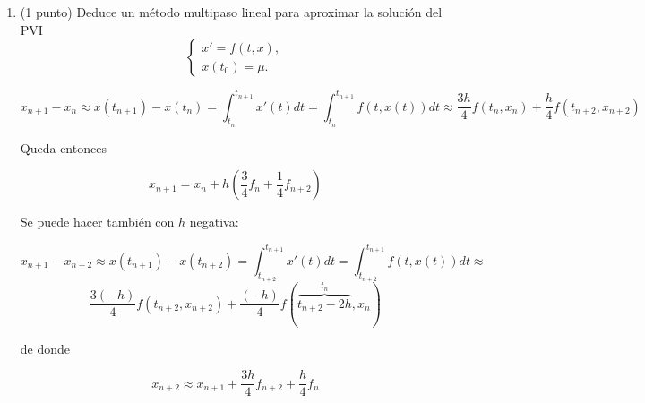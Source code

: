 \documentclass[12pt]{article}
\begin{document}
\begin{ejercicio}[3 puntos]
\begin{enumerate}
        \newpage

        \item (1 punto) Deduce un método multipaso lineal para aproximar la solución del PVI 
        \begin{equation}
            \begin{cases}
              x' = f(t,x),\\
              x(t_0)=\mu.
            \end{cases}
        \end{equation}
        
        $$x_{n+1} - x_n \approx x(t_{n+1}) - x(t_n) = \int_{t_n}^{t_{n+1}} x'(t) dt = \int_{t_n}^{t_{n+1}} f(t,x(t)) dt \approx \dfrac{3h}{4} f(t_n,x_n) + \dfrac{h}{4} f(t_{n+2}, x_{n+2})$$

        Queda entonces

        $$x_{n+1} = x_n + h \left( \dfrac{3}{4} f_n + \dfrac{1}{4} f_{n+2} \right)$$

        Se puede hacer también con $h$ negativa:

        $$x_{n+1} - x_{n+2} \approx x(t_{n+1}) - x(t_{n+2}) = \int_{t_{n+2}}^{t_{n+1}} x'(t) dt = \int_{t_{n+2}}^{t_{n+1}} f(t,x(t)) dt \approx $$
        $$ \dfrac{3 (-h)}{4} f(t_{n+2},x_{n+2}) + \dfrac{(-h)}{4} f(\overbrace{t_{n+2} - 2h}^{t_n}, x_{n})$$

        de donde

        $$x_{n+2} \approx x_{n+1} + \dfrac{3h}{4} f_{n+2} + \dfrac{h}{4} f_n$$
      \end{enumerate}
    \end{ejercicio}

    \newpage
\end{document}

